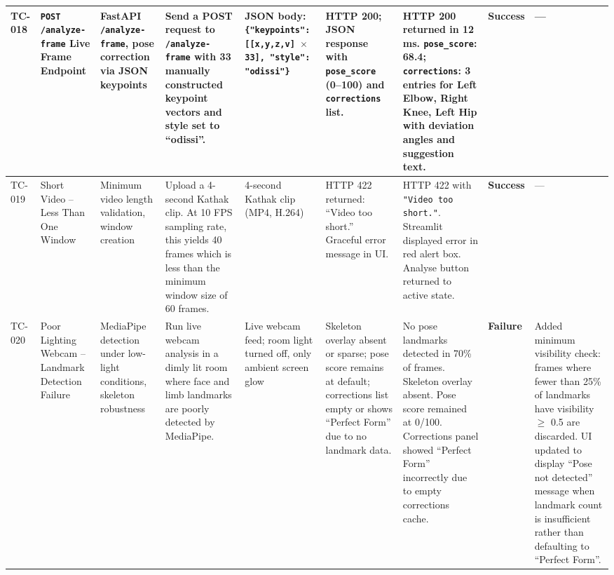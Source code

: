 \documentclass[12pt,a4paper]{article}
\begin{document}
\begin{longtable}{|P{0.6cm}|P{2.2cm}|P{2.2cm}|P{2.8cm}|P{2.4cm}|P{3.0cm}|P{3.0cm}|P{1.1cm}|P{2.4cm}|}
TC-018 &
\texttt{POST /analyze-frame} Live Frame Endpoint &
FastAPI \texttt{/analyze-frame}, pose correction via JSON keypoints &
Send a POST request to \texttt{/analyze-frame} with 33 manually constructed keypoint vectors and style set to ``odissi''. &
JSON body: \texttt{\{"keypoints": [[x,y,z,v] $\times$ 33], "style": "odissi"\}} &
HTTP 200; JSON response with \texttt{pose\_score} (0--100) and \texttt{corrections} list. &
HTTP 200 returned in 12 ms. \texttt{pose\_score}: 68.4; \texttt{corrections}: 3 entries for Left Elbow, Right Knee, Left Hip with deviation angles and suggestion text. &
\textbf{Success} &
--- \\
\hline

TC-019 &
Short Video -- Less Than One Window &
Minimum video length validation, window creation &
Upload a 4-second Kathak clip. At 10 FPS sampling rate, this yields 40 frames which is less than the minimum window size of 60 frames. &
4-second Kathak clip (MP4, H.264) &
HTTP 422 returned: ``Video too short.'' Graceful error message in UI. &
HTTP 422 with \texttt{"Video too short."}. Streamlit displayed error in red alert box. Analyse button returned to active state. &
\textbf{Success} &
--- \\
\hline

TC-020 &
Poor Lighting Webcam -- Landmark Detection Failure &
MediaPipe detection under low-light conditions, skeleton robustness &
Run live webcam analysis in a dimly lit room where face and limb landmarks are poorly detected by MediaPipe. &
Live webcam feed; room light turned off, only ambient screen glow &
Skeleton overlay absent or sparse; pose score remains at default; corrections list empty or shows ``Perfect Form'' due to no landmark data. &
No pose landmarks detected in 70\% of frames. Skeleton overlay absent. Pose score remained at 0/100. Corrections panel showed ``Perfect Form'' incorrectly due to empty corrections cache. &
\textbf{Failure} &
Added minimum visibility check: frames where fewer than 25\% of landmarks have visibility $\geq$ 0.5 are discarded. UI updated to display ``Pose not detected'' message when landmark count is insufficient rather than defaulting to ``Perfect Form''. \\
\hline

\end{longtable}
\end{document}
